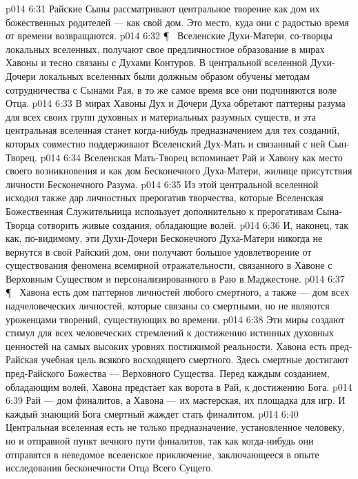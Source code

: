 \vs p014 6:31 Райские Сыны рассматривают центральное творение как дом их божественных родителей --- как свой дом. Это место, куда они с радостью время от времени возвращаются.
\vs p014 6:32 \P\ \bibnobreakspace {} Вселенские Духи\hyp{}Матери, со\hyp{}творцы локальных вселенных, получают свое предличностное образование в мирах Хавоны и тесно связаны с Духами Контуров. В центральной вселенной Духи\hyp{}Дочери локальных вселенных были должным образом обучены методам сотрудничества с Сынами Рая, в то же самое время все они подчиняются воле Отца.
\vs p014 6:33 В мирах Хавоны Дух и Дочери Духа обретают паттерны разума для всех своих групп духовных и материальных разумных существ, и эта центральная вселенная станет когда\hyp{}нибудь предназначением для тех созданий, которых совместно поддерживают Вселенский Дух\hyp{}Мать и связанный с ней Сын\hyp{}Творец.
\vs p014 6:34 Вселенская Мать\hyp{}Творец вспоминает Рай и Хавону как место своего возникновения и как дом Бесконечного Духа\hyp{}Матери, жилище присутствия личности Бесконечного Разума.
\vs p014 6:35 Из этой центральной вселенной исходил также дар личностных прерогатив творчества, которые Вселенская Божественная Служительница использует дополнительно к прерогативам Сына\hyp{}Творца сотворить живые создания, обладающие волей.
\vs p014 6:36 И, наконец, так как, по\hyp{}видимому, эти Духи\hyp{}Дочери Бесконечного Духа\hyp{}Матери никогда не вернутся в свой Райский дом, они получают большое удовлетворение от существования феномена всемирной отражательности, связанного в Хавоне с Верховным Существом и персонализированного в Раю в Маджестоне.
\vs p014 6:37 \P\ \bibnobreakspace {} Хавона есть дом паттернов личностей любого смертного, а также --- дом всех надчеловеческих личностей, которые связаны со смертными, но не являются уроженцами творений, существующих во времени.
\vs p014 6:38 Эти миры создают стимул для всех человеческих стремлений к достижению истинных духовных ценностей на самых высоких уровнях постижимой реальности. Хавона есть пред\hyp{}Райская учебная цель всякого восходящего смертного. Здесь смертные достигают пред\hyp{}Райского Божества --- Верховного Существа. Перед каждым созданием, обладающим волей, Хавона предстает как ворота в Рай, к достижению Бога.
\vs p014 6:39 Рай --- дом финалитов, а Хавона --- их мастерская, их площадка для игр. И каждый знающий Бога смертный жаждет стать финалитом.
\vs p014 6:40 Центральная вселенная есть не только предназначение, установленное человеку, но и отправной пункт вечного пути финалитов, так как когда\hyp{}нибудь они отправятся в неведомое вселенское приключение, заключающееся в опыте исследования бесконечности Отца Всего Сущего.
